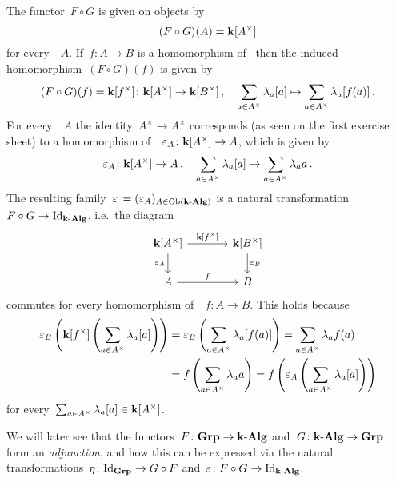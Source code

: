 \begin{example}
  The functor~$F \circ G$ is given on objects by
  \[
      (F \circ G)(A)
    = \mathbf{k}[A^\times]
  \]
  for every~{\kalg}~$A$.
  If~$f \colon A \to B$ is a homomorphism of~{\kalgs} then the induced~{\kalg} homomorphism~$(F \circ G)(f)$ is given by
  \[
            (F \circ G)(f)
    =       \mathbf{k}[f^\times]
    \colon  \mathbf{k}[A^\times]
    \to     \mathbf{k}[B^\times] \,,
    \quad   \sum_{a \in A^\times} \lambda_a [a]
    \mapsto \sum_{a \in A^\times} \lambda_a [f(a)] \,.
  \]
  For every~{\kalg}~$A$ the identity~$A^\times \to A^\times$ corresponds (as seen on the first exercise sheet) to a homomorphism of~{\kalg}~$\varepsilon_A \colon \mathbf{k}[A^\times] \to A$, which is given by
  \[
            \varepsilon_A
    \colon  \mathbf{k}[A^\times]
    \to     A \,,
    \quad   \sum_{a \in A^\times} \lambda_a [a]
    \mapsto \sum_{a \in A^\times} \lambda_a a \,.
  \]
  The resulting family~$\varepsilon \coloneqq (\varepsilon_A)_{A \in \operatorname{Ob}(\text{$\mathbf{k}$-$\mathbf{Alg}$})}$ is a natural transformation~$F \circ G \to \mathrm{Id}_{\text{$\mathbf{k}$-$\mathbf{Alg}$}}$, i.e.\ the diagram
  \[
    \begin{tikzcd}[column sep = large]
        \kf[A^\times]
        \arrow{r}[above]{\kf[f^\times]}
        \arrow{d}[left]{\varepsilon_A}
      & \kf[B^\times]
        \arrow{d}[right]{\varepsilon_B}
      \\
        A
        \arrow{r}[above]{f}
      & B
    \end{tikzcd}
  \]
  commutes for every homomorphism of~{\kalgs}~$f \colon A \to B$.
  This holds because
  \begin{align*}
        \varepsilon_B\left( \mathbf{k}[f^\times]\left( \sum_{a \in A^\times} \lambda_a [a] \right) \right)
    &=  \varepsilon_B\left( \sum_{a \in A^\times} \lambda_a [f(a)] \right)
     =  \sum_{a \in A^\times} \lambda_a f(a)  \\
    &=  f\left( \sum_{a \in A^\times} \lambda_a a \right)
     =  f\left( \varepsilon_A\left( \sum_{a \in A^\times} \lambda_a [a] \right) \right)
  \end{align*}
  for every~$\sum_{a \in A^\times} \lambda_a [a] \in \mathbf{k}[A^\times]$.
  
  We will later see that the functors~$F \colon \mathbf{Grp} \to \text{$\mathbf{k}$-$\mathbf{Alg}$}$ and~$G \colon \text{$\mathbf{k}$-$\mathbf{Alg}$} \to \mathbf{Grp}$ form an \emph{adjunction}, and how this can be expressed via the natural transformations~$\eta \colon \mathrm{Id}_{\mathbf{Grp}} \to G \circ F$ and~$\varepsilon \colon F \circ G \to \mathrm{Id}_{\text{$\mathbf{k}$-$\mathbf{Alg}$}}$.
\end{example}










